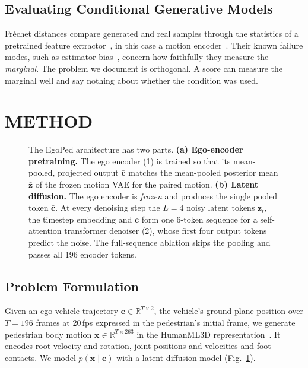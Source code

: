 \documentclass[letterpaper, 10 pt, conference]{ieeeconf}
\newcommand{\method}{EgoPed\xspace}
\begin{document}
\subsection{Evaluating Conditional Generative Models}

Fréchet distances compare generated and real samples through the statistics of a pretrained feature extractor~\cite{heusel2017fid}, in this case a motion encoder~\cite{guo2022humanml3d}. Their known failure modes, such as estimator bias~\cite{chong2020unbiasedfid}, concern how faithfully they measure the \emph{marginal}. The problem we document is orthogonal. A score can measure the marginal well and say nothing about whether the condition was used.

\section{METHOD}
\label{sec:method}

\begin{figure}[t]
  \centering
  \resizebox{\linewidth}{!}{}
  \caption{The \method architecture has two parts. \textbf{(a) Ego-encoder pretraining.} The ego encoder (1) is trained so that its mean-pooled, projected output $\bar{\mathbf{c}}$ matches the mean-pooled posterior mean $\bar{\mathbf{z}}$ of the frozen motion VAE for the paired motion. \textbf{(b) Latent diffusion.} The ego encoder is \emph{frozen} and produces the single pooled token $\bar{\mathbf{c}}$. At every denoising step the $L=4$ noisy latent tokens $\mathbf{z}_t$, the timestep embedding and $\bar{\mathbf{c}}$ form one 6-token sequence for a self-attention transformer denoiser (2), whose first four output tokens predict the noise. The full-sequence ablation skips the pooling and passes all 196 encoder tokens.}
  \label{fig:architecture}
\end{figure}

\subsection{Problem Formulation}

Given an ego-vehicle trajectory $\mathbf{e} \in \mathbb{R}^{T \times 2}$, the vehicle's ground-plane position over $T=196$ frames at 20\,fps expressed in the pedestrian's initial frame, we generate pedestrian body motion $\mathbf{x} \in \mathbb{R}^{T \times 263}$ in the HumanML3D representation~\cite{guo2022humanml3d}. It encodes root velocity and rotation, joint positions and velocities and foot contacts.
We model $p(\mathbf{x} \mid \mathbf{e})$ with a latent diffusion model (Fig.~\ref{fig:architecture}).
\end{document}
